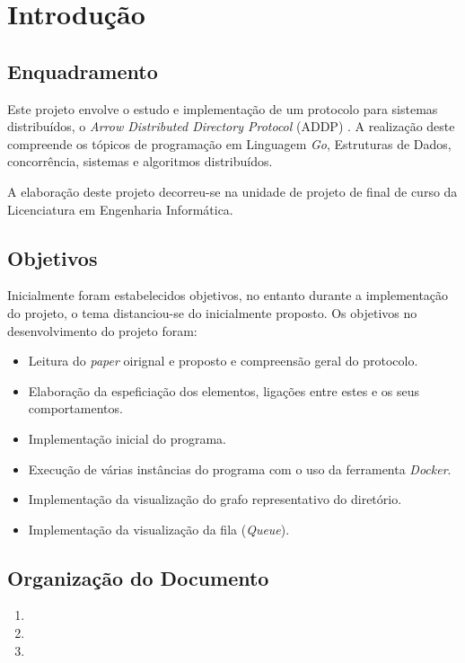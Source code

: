 \chapter{Introdução}
\label{chap:intro}
\section{Enquadramento}
\label{sec:amb} 



Este projeto envolve o estudo e implementação de um protocolo para sistemas distribuídos, o \textit{Arrow Distributed Directory Protocol} (ADDP) \cite{Arrow}. 
A realização deste compreende os tópicos de programação em Linguagem \emph{Go}, Estruturas de Dados, concorrência, sistemas e algoritmos distribuídos.

A elaboração deste projeto decorreu-se na unidade de projeto de final de curso da Licenciatura em Engenharia Informática.



\section{Objetivos}
\label{sec:obj}
Inicialmente foram estabelecidos objetivos, no entanto durante a implementação do projeto, o tema distanciou-se do inicialmente proposto. 
Os objetivos no desenvolvimento do projeto foram:

\begin{itemize}
    \item Leitura do \emph{paper} oirignal e proposto e compreensão geral do protocolo.
    \item Elaboração da espeficiação dos elementos, ligações entre estes e os seus comportamentos.
    \item Implementação inicial do programa.
    \item Execução de várias instâncias do programa com o uso da ferramenta \emph{Docker}.
    \item Implementação da visualização do grafo representativo do diretório.
    \item Implementação da visualização da fila (\emph{Queue}).

\end{itemize}


\section{Organização do Documento}
\label{sec:organ}
\begin{enumerate}
\item 
\item 
\item 
\end{enumerate}
